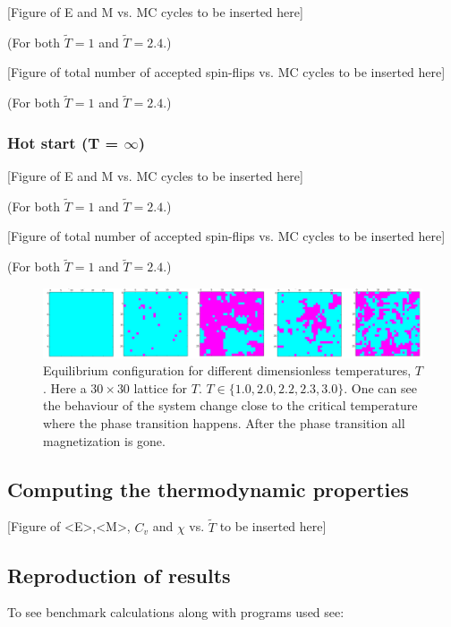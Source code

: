 \documentclass[11pt,a4paper,english]{article}
\numberwithin{equation}{section}
\begin{document}
[Figure of E and M vs. MC cycles to be inserted here]

(For both $\tilde{T}=1$ and $\tilde{T}=2.4$.)


[Figure of total number of accepted spin-flips vs. MC cycles to be inserted here] 

(For both $\tilde{T}=1$ and $\tilde{T}=2.4$.)

\subsubsection{Hot start (T = \texorpdfstring{$\infty$}{infinity})}

[Figure of E and M vs. MC cycles to be inserted here] 

(For both $\tilde{T}=1$ and $\tilde{T}=2.4$.)


[Figure of total number of accepted spin-flips vs. MC cycles to be inserted here]

(For both $\tilde{T}=1$ and $\tilde{T}=2.4$.)


\begin{figure}[H]
\centering
\includegraphics[scale=0.10]{pics/equilibrium_different_temperatures.png}
\caption{Equilibrium configuration for different dimensionless 
temperatures, $T$. Here a $30 \times 30$ lattice for $T$.
$T\in\{1.0, 2.0, 2.2, 2.3, 3.0\}$. One can see the behaviour of 
the system change close to the critical temperature where the phase 
transition happens. After the phase transition all magnetization is gone.} 
\label{fig:equilibrium_T}
\end{figure}

\subsection{Computing the thermodynamic properties}

[Figure of <E>,<M>, $C_v$ and $\chi$ vs. $\tilde{T}$ to be inserted here] 


\subsection{Reproduction of results}

To see benchmark calculations along with programs used see:
\end{document}
